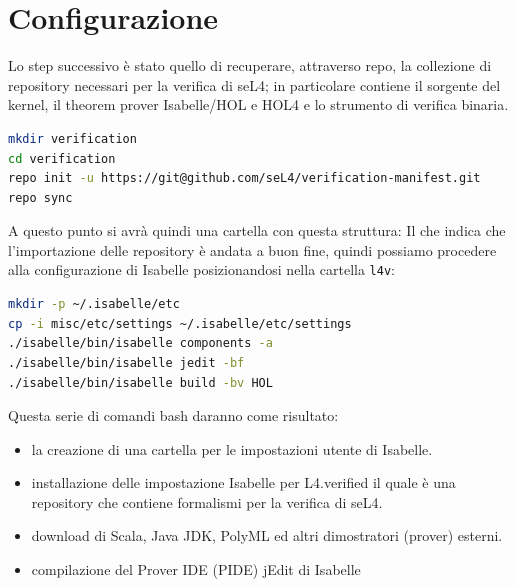 \section{Configurazione}
Lo step successivo è stato quello di recuperare, attraverso repo, la collezione di repository necessari per la verifica di seL4; in particolare contiene il sorgente del kernel, il theorem prover Isabelle/HOL e HOL4 e lo strumento di verifica binaria.
\begin{lstlisting}[language=bash]
mkdir verification
cd verification
repo init -u https://git@github.com/seL4/verification-manifest.git
repo sync
\end{lstlisting}
A questo punto  si avrà quindi una cartella con questa struttura:
Il che indica che l'importazione delle repository è andata a buon fine, quindi possiamo procedere alla configurazione di Isabelle posizionandosi nella cartella \texttt{l4v}:
\begin{lstlisting}[language=bash]
mkdir -p ~/.isabelle/etc
cp -i misc/etc/settings ~/.isabelle/etc/settings
./isabelle/bin/isabelle components -a
./isabelle/bin/isabelle jedit -bf
./isabelle/bin/isabelle build -bv HOL
\end{lstlisting}
Questa serie di comandi bash daranno come risultato:
\begin{itemize}
	\item la creazione di una cartella per le impostazioni utente di Isabelle.
	\item installazione delle impostazione Isabelle per L4.verified \cite{l4v} il quale è una repository che contiene formalismi per la verifica di seL4.
	\item download di Scala, Java JDK, PolyML ed altri dimostratori (prover) esterni.
	\item compilazione del Prover IDE (PIDE) jEdit di Isabelle
\end{itemize} 

